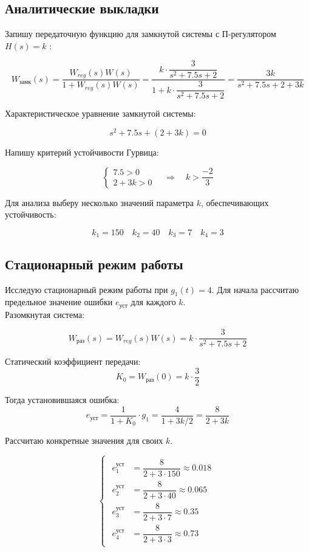 \documentclass[a4paper,12pt]{article}
\begin{document}
	
	\subsection{Аналитические выкладки}
	
	Запишу передаточную функцию для замкнутой системы с П-регулятором $H(s) = k$ :
	
	\[
	W_\text{замк}(s) = \dfrac{W_{reg}(s) W(s)}{1 + W_{reg}(s) W(s)} = \dfrac{k \cdot \dfrac{3}{s^2 + 7.5 s + 2}}{1 + k \cdot \dfrac{3}{s^2 + 7.5 s + 2}} = \dfrac{3k}{s^2 + 7.5 s + 2 + 3k}
	\]
	
	Характеристическое уравнение замкнутой системы:
	
	\[
	s^2 + 7.5 s + (2 + 3k) = 0
	\]
	
	Напишу критерий устойчивости Гурвица:
	
	\[
	\begin{cases}
		7.5 > 0 \\
		2 + 3k > 0
	\end{cases} \quad \Longrightarrow \quad k > \frac{-2}{3}
	\]
	
	Для анализа выберу несколько значений параметра $k$, обеспечивающих устойчивость:
	
	\[
	k_1 = 150 \quad k_2 = 40 \quad k_3 = 7 \quad k_4 = 3
	\]
	
	\subsection{Стационарный режим работы}	
	
	Исследую стационарный режим работы при $g_1(t) = 4$. Для начала рассчитаю предельное значение ошибки $e_\text{уст}$ для каждого $k$.  \\
	
	Разомкнутая система:
	
	\[
	W_\text{раз}(s) = W_{reg}(s) W(s) = k \cdot \dfrac{3}{s^2 + 7.5 s + 2}
	\]
	
	Статический коэффициент передачи:
	\[
	K_0 = W_\text{раз}(0) = k \cdot \frac{3}{2}
	\]
	
	Тогда установившаяся ошибка:
	\[
	e_\text{уст} = \frac{1}{1 + K_0} \cdot g_1 = \frac{4}{1 + 3k/2} = \frac{8}{2 + 3k}
	\]

	Рассчитаю конкретные значения для своих \(k\).
	
	\[
	\begin{cases}\begin{aligned}
		e_\text{1}^\text{уст} &= \dfrac{8}{2 + 3 \cdot 150} \approx 0.018 \\
		e_\text{2}^\text{уст} &= \dfrac{8}{2 + 3 \cdot 40} \approx 0.065 \\
		e_\text{3}^\text{уст} &= \dfrac{8}{2 + 3 \cdot 7} \approx 0.35 \\
		e_\text{4}^\text{уст} &= \dfrac{8}{2 + 3 \cdot 3} \approx 0.73
	\end{aligned}\end{cases}
	\]
	
\end{document}
